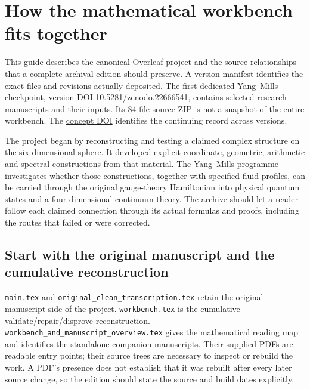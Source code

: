 \section{How the mathematical workbench fits
together}\label{full-workbench-reading-map-md-how-the-mathematical-workbench-fits-together}

This guide describes the canonical Overleaf project and the source
relationships that a complete archival edition should preserve. A
version manifest identifies the exact files and revisions actually
deposited. The first dedicated Yang--Mills checkpoint,
\href{https://doi.org/10.5281/zenodo.22666541}{version DOI
10.5281/zenodo.22666541}, contains selected research manuscripts and
their inputs. Its 84-file source ZIP is not a snapshot of the entire
workbench. The \href{https://doi.org/10.5281/zenodo.22666540}{concept
DOI} identifies the continuing record across versions.

The project began by reconstructing and testing a claimed complex
structure on the six-dimensional sphere. It developed explicit
coordinate, geometric, arithmetic and spectral constructions from that
material. The Yang--Mills programme investigates whether those
constructions, together with specified fluid profiles, can be carried
through the original gauge-theory Hamiltonian into physical quantum
states and a four-dimensional continuum theory. The archive should let a
reader follow each claimed connection through its actual formulas and
proofs, including the routes that failed or were corrected.

\subsection{Start with the original manuscript and the cumulative
reconstruction}\label{full-workbench-reading-map-md-start-with-the-original-manuscript-and-the-cumulative-reconstruction}

\texttt{main.tex} and \texttt{original\_clean\_transcription.tex} retain
the original-manuscript side of the project. \texttt{workbench.tex} is
the cumulative validate/repair/disprove reconstruction.
\texttt{workbench\_and\_manuscript\_overview.tex} gives the mathematical
reading map and identifies the standalone companion manuscripts. Their
supplied PDFs are readable entry points; their source trees are
necessary to inspect or rebuild the work. A PDF's presence does not
establish that it was rebuilt after every later source change, so the
edition should state the source and build dates explicitly.

